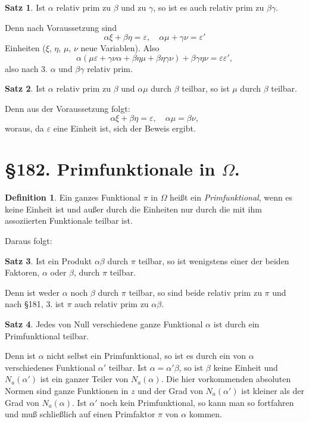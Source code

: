 \documentclass[12pt,a4paper]{article}
\theoremstyle{definition}
\newtheorem{defin}{Definition}[section]
\newtheorem{satz}{Satz}[section]
\begin{document}
\begin{satz}
Ist $\alpha$ relativ prim zu $\beta$ und zu $\gamma$, so ist es auch relativ prim zu $\beta\gamma$.
\end{satz}
Denn nach Voraussetzung sind
\[\alpha\xi + \beta\eta = \varepsilon, \quad \alpha\mu + \gamma\nu = \varepsilon'\]
Einheiten ($\xi$, $\eta$, $\mu$, $\nu$ neue Variablen). Also
\[\alpha(\mu\varepsilon + \gamma\nu\alpha + \beta\eta\mu + \beta\eta\gamma\nu) + \beta\gamma\eta\nu = \varepsilon\varepsilon',\]
also nach 3. $\alpha$ und $\beta\gamma$ relativ prim.

\begin{satz}
Ist $\alpha$ relativ prim zu $\beta$ und $\alpha\mu$ durch $\beta$ teilbar, so ist $\mu$ durch $\beta$ teilbar.
\end{satz}
Denn aus der Voraussetzung folgt:
\[\alpha\xi + \beta\eta = \varepsilon, \quad \alpha\mu = \beta\nu,\]
woraus, da $\varepsilon$ eine Einheit ist, sich der Beweis ergibt.

\newpage
\section*{\S 182. Primfunktionale in $\Omega$.}

\begin{defin}
Ein ganzes Funktional $\pi$ in $\Omega$ heißt ein \emph{Primfunktional}, wenn es keine Einheit ist und außer durch die Einheiten nur durch die mit ihm assoziierten Funktionale teilbar ist.
\end{defin}

Daraus folgt:

\begin{satz}
Ist ein Produkt $\alpha\beta$ durch $\pi$ teilbar, so ist wenigstens einer der beiden Faktoren, $\alpha$ oder $\beta$, durch $\pi$ teilbar.
\end{satz}
Denn ist weder $\alpha$ noch $\beta$ durch $\pi$ teilbar, so sind beide relativ prim zu $\pi$ und nach \S 181, 3. ist $\pi$ auch relativ prim zu $\alpha\beta$.

\begin{satz}
Jedes von Null verschiedene ganze Funktional $\alpha$ ist durch ein Primfunktional teilbar.
\end{satz}
Denn ist $\alpha$ nicht selbst ein Primfunktional, so ist es durch ein von $\alpha$ verschiedenes Funktional $\alpha'$ teilbar. Ist $\alpha = \alpha'\beta$, so ist $\beta$ keine Einheit und $N_a(\alpha')$ ist ein ganzer Teiler von $N_a(\alpha)$. Die hier vorkommenden absoluten Normen sind ganze Funktionen in $z$ und der Grad von $N_a(\alpha')$ ist kleiner als der Grad von $N_a(\alpha)$. Ist $\alpha'$ noch kein Primfunktional, so kann man so fortfahren und muß schließlich auf einen Primfaktor $\pi$ von $\alpha$ kommen.
\end{document}
